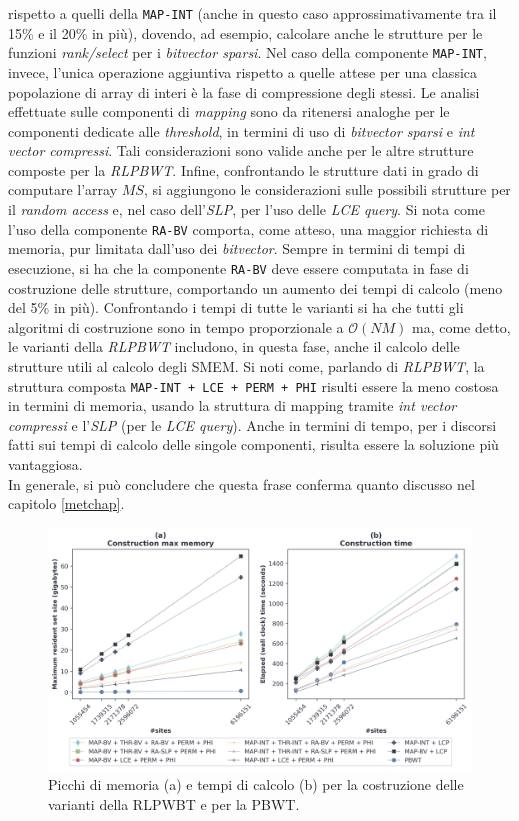 rispetto a quelli della \texttt{MAP-INT} (anche in questo caso
approssimativamente tra il 15\% e il 20\% in più), dovendo, ad esempio, calcolare
anche le strutture per le funzioni \textit{rank/select} per i \textit{bitvector
  sparsi}. Nel caso della componente 
\texttt{MAP-INT}, invece, l'unica operazione aggiuntiva rispetto a quelle attese
per una classica popolazione di array di interi è la fase di compressione degli
stessi. Le analisi effettuate sulle componenti di \textit{mapping} sono da
ritenersi analoghe per le componenti dedicate alle \textit{threshold}, in
termini di uso di \textit{bitvector sparsi} e \textit{int vector
  compressi}. Tali considerazioni sono valide anche per le altre strutture
composte per la \textit{RLPBWT}. Infine, confrontando le strutture dati in grado
di computare l'array $MS$, si aggiungono le considerazioni sulle possibili
strutture per il \textit{random access} e, nel caso dell'\textit{SLP}, per l'uso
delle \textit{LCE query}. Si nota come l'uso della componente \texttt{RA-BV}
comporta, come atteso, una maggior richiesta di memoria, pur limitata dall'uso
dei \textit{bitvector}. Sempre in termini di tempi di esecuzione, si ha che la
componente \texttt{RA-BV} deve essere computata in fase di costruzione delle
strutture, comportando un aumento dei tempi di calcolo (meno del 5\% in
più). Confrontando i tempi di 
tutte le varianti si ha che tutti gli algoritmi di costruzione sono in tempo
proporzionale a $\mathcal{O}(NM)$ ma, come detto, le varianti della
\textit{RLPBWT} includono, in questa fase, anche il calcolo delle strutture
utili al calcolo degli SMEM. Si noti come, parlando di \textit{RLPBWT}, la
struttura composta \texttt{MAP-INT + LCE + PERM + PHI} risulti essere la meno
costosa in termini di memoria, usando la struttura di mapping tramite
\textit{int vector compressi} e l'\textit{SLP} (per le \textit{LCE
  query}). Anche in termini di tempo, per i discorsi fatti sui tempi di calcolo
delle singole componenti, risulta essere la soluzione più vantaggiosa.\\
In generale, si può 
concludere che questa frase conferma quanto discusso nel capitolo
\ref{metchap}.\\ 
\begin{figure}
  \centering
  \includegraphics[width=\linewidth]{img/make_time_mem_paper.png}
  \caption{Picchi di memoria (a) e tempi di calcolo (b) per la
    costruzione delle varianti della RLPWBT e per 
    la PBWT.}
  \label{fig:maketimememchr}
\end{figure}
